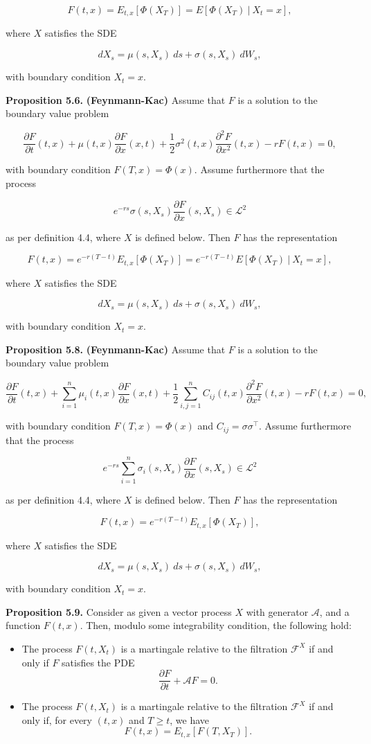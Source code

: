 \documentclass[
]{article}
\providecommand{\tightlist}{%
  \setlength{\itemsep}{0pt}\setlength{\parskip}{0pt}}
\begin{document}
\[
F(t,x)=E_{t,x}[\Phi(X_T)]=E[\Phi(X_T)\ \vert\ X_t=x],
\]

where \(X\) satisfies the SDE

\[
dX_s=\mu(s,X_s)\ ds+\sigma(s,X_s)\ dW_s,
\]

with boundary condition \(X_t=x\).

\textbf{Proposition 5.6.} \textbf{(Feynmann-Kac)} Assume that \(F\) is a
solution to the boundary value problem

\[
\frac{\partial F}{\partial t}(t,x)+\mu(t,x)\frac{\partial F}{\partial x}(x,t)+\frac{1}{2}\sigma^2(t,x)\frac{\partial^2 F}{\partial x^2}(t,x)-rF(t,x)=0,
\]

with boundary condition \(F(T,x)=\Phi(x)\). Assume furthermore that the
process

\[
e^{-rs}\sigma(s,X_s)\frac{\partial F}{\partial x}(s,X_s) \in \mathcal{L}^2
\]

as per definition 4.4, where \(X\) is defined below. Then \(F\) has the
representation

\[
F(t,x)=e^{-r(T-t)}E_{t,x}[\Phi(X_T)]=e^{-r(T-t)}E[\Phi(X_T)\ \vert\ X_t=x],
\]

where \(X\) satisfies the SDE

\[
dX_s=\mu(s,X_s)\ ds+\sigma(s,X_s)\ dW_s,
\]

with boundary condition \(X_t=x\).

\textbf{Proposition 5.8.} \textbf{(Feynmann-Kac)} Assume that \(F\) is a
solution to the boundary value problem

\[
\frac{\partial F}{\partial t}(t,x)+\sum_{i=1}^n\mu_i(t,x)\frac{\partial F}{\partial x}(x,t)+\frac{1}{2}\sum_{i,j=1}^n C_{ij}(t,x)\frac{\partial^2 F}{\partial x^2}(t,x)-rF(t,x)=0,
\]

with boundary condition \(F(T,x)=\Phi(x)\) and
\(C_{ij}=\sigma \sigma^\top\). Assume furthermore that the process

\[
e^{-rs}\sum_{i=1}^n\sigma_i(s,X_s)\frac{\partial F}{\partial x}(s,X_s) \in \mathcal{L}^2
\]

as per definition 4.4, where \(X\) is defined below. Then \(F\) has the
representation

\[
F(t,x)=e^{-r(T-t)}E_{t,x}[\Phi(X_T)],
\]

where \(X\) satisfies the SDE

\[
dX_s=\mu(s,X_s)\ ds+\sigma(s,X_s)\ dW_s,
\]

with boundary condition \(X_t=x\).

\textbf{Proposition 5.9.} Consider as given a vector process \(X\) with
generator \(\mathcal{A}\), and a function \(F(t,x)\). Then, modulo some
integrability condition, the following hold:

\begin{itemize}
\tightlist
\item
  The process \(F(t,X_t)\) is a martingale relative to the filtration
  \(\mathcal{F}^X\) if and only if \(F\) satisfies the PDE \[
    \frac{\partial F}{\partial t}+\mathcal{A}F=0.
    \]
\item
  The process \(F(t,X_t)\) is a martingale relative to the filtration
  \(\mathcal{F}^X\) if and only if, for every \((t,x)\) and \(T\ge t\),
  we have \[
    F(t,x)=E_{t,x}[F(T,X_T)].
    \]
\end{itemize}
\end{document}
